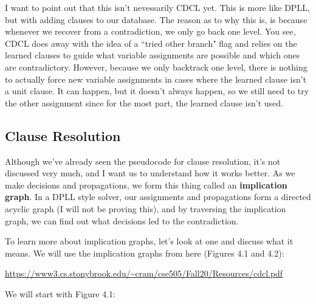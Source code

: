 \documentclass[../main.tex]{subfiles}
\begin{document}
I want to point out that this isn't nevessarily CDCL yet. This is more like DPLL, but with 
adding clauses to our database. The reason as to why this is, is because whenever we recover 
from a contradiction, we only go back one level. You see, CDCL does away with the idea of a
``tried other branch" flag and relies on the learned clauses to guide what variable assignments
are possible and which ones are contradictory. However, because we only backtrack one level, there 
is nothing to actually force new variable assignments in cases where the learned clause isn't a unit 
clause. It can happen, but it doesn't always happen, so we still need to try the other assignment 
since for the most part, the learned clause isn't used.

\subsection{Clause Resolution}

Although we've already seen the pseudocode for clause resolution, it's not discussed very 
much, and I want us to understand how it works better. As we make decisions and propagations, 
we form this thing called an \textbf{implication graph}. In a DPLL style solver, our assignments 
and propagations form a directed acyclic graph (I will not be proving this), and by traversing the
implication graph, we can find out what decisions led to the contradiction.

To learn more about implication graphs, let's look at one and discuss what it means.
We will use the implication graphs from here (Figures 4.1 and 4.2): 
\begin{center}
    \small{\url{https://www3.cs.stonybrook.edu/~cram/cse505/Fall20/Resources/cdcl.pdf}}
\end{center}

We will start with Figure 4.1:

\end{document}
